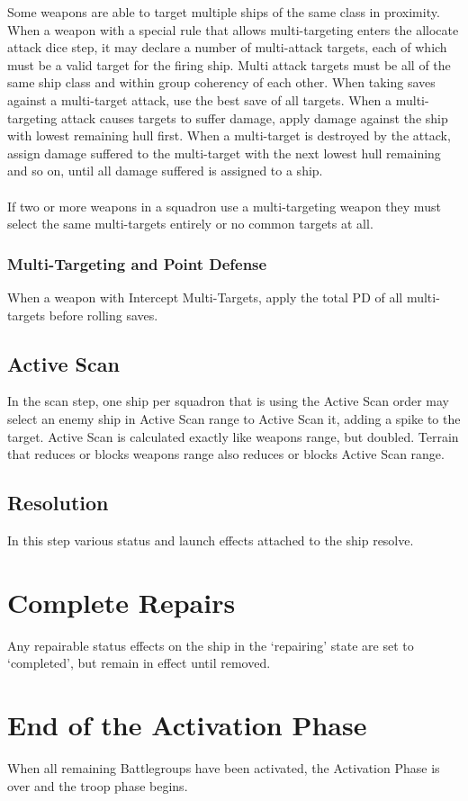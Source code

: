 Some weapons are able to target multiple ships of the same class in proximity. When a weapon with a special rule that allows multi-targeting enters the allocate attack dice step, it may declare a number of multi-attack targets, each of which must be a valid target for the firing ship. Multi attack targets must be all of the same ship class and within group coherency of each other. When taking saves against a multi-target attack, use the best save of all targets. When a multi-targeting attack causes targets to suffer damage, apply damage against the ship with lowest remaining hull first. When a multi-target is destroyed by the attack, assign damage suffered to the multi-target with the next lowest hull remaining and so on, until all damage suffered is assigned to a ship.\\\\
If two or more weapons in a squadron use a multi-targeting weapon they must select the same multi-targets entirely or no common targets at all.

\subsubsection{Multi-Targeting and Point Defense}
When a weapon with Intercept Multi-Targets, apply the total PD of all multi-targets before rolling saves. 

\subsection{Active Scan}
In the scan step, one ship per squadron that is using the Active Scan order may select an enemy ship in Active Scan range to Active Scan it, adding a spike to the target. Active Scan is calculated exactly like weapons range, but doubled. Terrain that reduces or blocks weapons range also reduces or blocks Active Scan range.

\subsection{Resolution}
In this step various status and launch effects attached to the ship resolve.

\section{Complete Repairs}
Any repairable status effects on the ship in the `repairing' state are set to `completed', but remain in effect until removed.

\section{End of the Activation Phase}
When all remaining Battlegroups have been activated, the Activation Phase is over and the troop phase begins.


